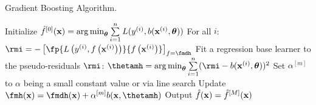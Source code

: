 \begin{algorithm}[H]
  \begin{footnotesize}
  \begin{center}
  \caption{Gradient Boosting Algorithm.}
    \begin{algorithmic}[1]
      \State Initialize $\hat{f}^{[0]}(\mathbf{x}) = \operatorname{arg\,min}_{\bm{\theta}} \sum\limits_{i=1}^n L(y^{(i)}, b(\mathbf{x}^{(i)}, \bm{\theta}))$
          \State For all $i$: $\rmi = -\left[\fp{\Lxyi}{\fxi}\right]_{f=\fmdh}$
        \State Fit a regression base learner to the pseudo-residuals $\rmi$:
        \State $\thetamh = \argmin \limits_{\bm{\theta}} \sumin (\rmi - b(\xi, \bm{\theta}))^2$
        \State Set $\alpha^{[m]}$ to $\alpha$ being a small constant value or via line search
        \State Update $\fmh(\xv) = \fmdh(\xv) + \alpha^{[m]} b(\xv, \thetamh)$
      \EndFor
      \State Output $\hat{f}(\mathbf{x}) = \hat{f}^{[M]}(\mathbf{x})$
    \end{algorithmic}
    \end{center}
    \end{footnotesize}
\end{algorithm}
